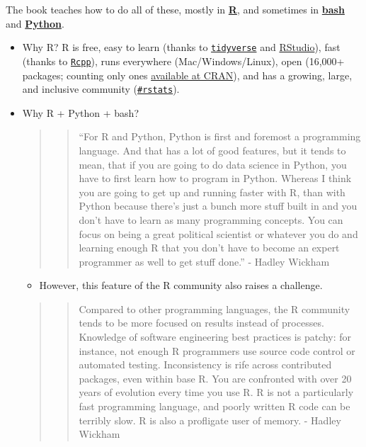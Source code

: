 \documentclass[
]{book}
\providecommand{\tightlist}{%
  \setlength{\itemsep}{0pt}\setlength{\parskip}{0pt}}
\begin{document}
The book teaches how to do all of these, mostly in \href{https://www.r-project.org/about.html}{\textbf{R}}, and sometimes in \href{https://www.gnu.org/software/bash/}{\textbf{bash}} and \href{https://www.python.org/about/}{\textbf{Python}}.

\begin{itemize}
\item
  Why R? R is free, easy to learn (thanks to \href{https://www.tidyverse.org/}{\texttt{tidyverse}} and \href{https://rstudio.com/}{RStudio}), fast (thanks to \href{https://cran.r-project.org/web/packages/Rcpp/index.html}{\texttt{Rcpp}}), runs everywhere (Mac/Windows/Linux), open (16,000+ packages; counting only ones \href{https://cran.r-project.org/web/packages/}{available at CRAN}), and has a growing, large, and inclusive community (\href{https://twitter.com/search?q=\%23rstats\&src=typed_query}{\texttt{\#rstats}}).
\item
  Why R + Python + bash?

  \begin{quote}
  \begin{quote}
  ``For R and Python, Python is first and foremost a programming language. And that has a lot of good features, but it tends to mean, that if you are going to do data science in Python, you have to first learn how to program in Python. Whereas I think you are going to get up and running faster with R, than with Python because there's just a bunch more stuff built in and you don't have to learn as many programming concepts. You can focus on being a great political scientist or whatever you do and learning enough R that you don't have to become an expert programmer as well to get stuff done.'' - Hadley Wickham
  \end{quote}
  \end{quote}

  \begin{itemize}
  \tightlist
  \item
    However, this feature of the R community also raises a challenge.
  \end{itemize}

  \begin{quote}
  \begin{quote}
  Compared to other programming languages, the R community tends to be more focused on results instead of processes. Knowledge of software engineering best practices is patchy: for instance, not enough R programmers use source code control or automated testing. Inconsistency is rife across contributed packages, even within base R. You are confronted with over 20 years of evolution every time you use R. R is not a particularly fast programming language, and poorly written R code can be terribly slow. R is also a profligate user of memory. - Hadley Wickham
  \end{quote}
  \end{quote}


\end{itemize}
\end{document}
